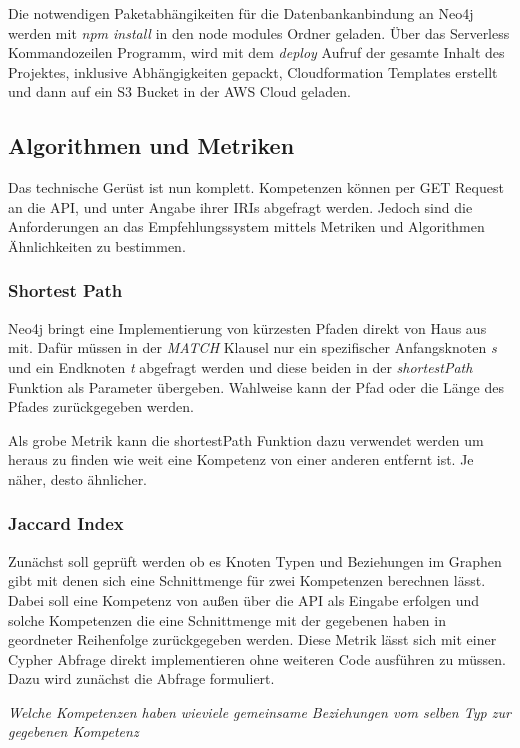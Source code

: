 Die notwendigen Paketabhängikeiten für die Datenbankanbindung an Neo4j werden mit \textit{npm install} in den node modules Ordner geladen. Über das Serverless Kommandozeilen Programm, wird mit dem \textit{deploy} Aufruf der gesamte Inhalt des Projektes, inklusive Abhängigkeiten gepackt, Cloudformation Templates erstellt und dann auf ein S3 Bucket in der AWS Cloud geladen. 

\subsection{Algorithmen und Metriken}

Das technische Gerüst ist nun komplett. Kompetenzen können per GET Request an die API, und unter Angabe ihrer IRIs abgefragt werden. Jedoch sind die Anforderungen an das Empfehlungssystem mittels Metriken und Algorithmen Ähnlichkeiten zu bestimmen. 

\subsubsection{Shortest Path}

Neo4j bringt eine Implementierung von kürzesten Pfaden direkt von Haus aus mit. Dafür müssen in der \textit{MATCH} Klausel nur ein spezifischer Anfangsknoten \textit{s} und ein Endknoten \textit{t} abgefragt werden und diese beiden in der \textit{shortestPath} Funktion als Parameter übergeben. Wahlweise kann der Pfad oder die Länge des Pfades zurückgegeben werden.

Als grobe Metrik kann die shortestPath Funktion dazu verwendet werden um heraus zu finden wie weit eine Kompetenz von einer anderen entfernt ist. Je näher, desto ähnlicher. 

\subsubsection{Jaccard Index}

Zunächst soll geprüft werden ob es Knoten Typen und Beziehungen im Graphen gibt mit denen sich eine Schnittmenge für zwei Kompetenzen berechnen lässt. Dabei soll eine Kompetenz von außen über die API als Eingabe erfolgen und solche Kompetenzen die eine Schnittmenge mit der gegebenen haben in geordneter Reihenfolge zurückgegeben werden. Diese Metrik lässt sich mit einer Cypher Abfrage direkt implementieren ohne weiteren Code ausführen zu müssen. Dazu wird zunächst die Abfrage formuliert. 

\textit{Welche Kompetenzen haben wieviele gemeinsame Beziehungen vom selben Typ zur gegebenen Kompetenz}

